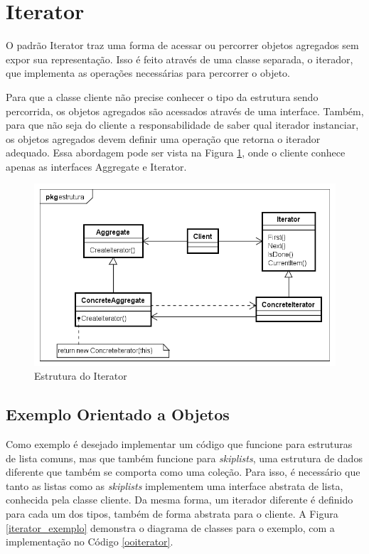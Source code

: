 \section{Iterator}

O padrão Iterator traz uma forma de acessar ou 
percorrer objetos agregados sem expor sua representação. 
Isso é feito através de uma classe separada, o iterador, 
que implementa as operações necessárias para percorrer 
o objeto. \cite{gamma:1995}

Para que a classe cliente não precise conhecer o tipo 
da estrutura sendo percorrida, os objetos agregados 
são acessados através de uma interface. Também, para 
que não seja do cliente a responsabilidade de saber 
qual iterador instanciar, os objetos agregados devem 
definir uma operação que retorna o iterador adequado. 
Essa abordagem pode ser vista na Figura \ref{iterator_struct}, 
onde o cliente conhece apenas as interfaces 
Aggregate e Iterator.

\begin{figure}[htb]
	\caption{\label{iterator_struct}Estrutura do Iterator}
	\begin{center}
	    \includegraphics[scale=0.5]{5_padroes-contexto-funcional/5.3_comportamentais/5.3.04_iterator/iterator_struct.png}
	\end{center}
\end{figure}

\subsection*{Exemplo Orientado a Objetos}

Como exemplo é desejado implementar um código 
que funcione para estruturas de lista comuns, mas 
que também funcione para \textit{skiplists}, uma 
estrutura de dados diferente que também se comporta 
como uma coleção. Para isso, é necessário que 
tanto as listas como as \textit{skiplists} implementem 
uma interface abstrata de lista, conhecida pela 
classe cliente. Da mesma forma, um iterador diferente 
é definido para cada um dos tipos, também de forma 
abstrata para o cliente. A Figura \ref{iterator_exemplo} 
demonstra o diagrama de classes para o exemplo, com a 
implementação no Código \ref{ooiterator}.

